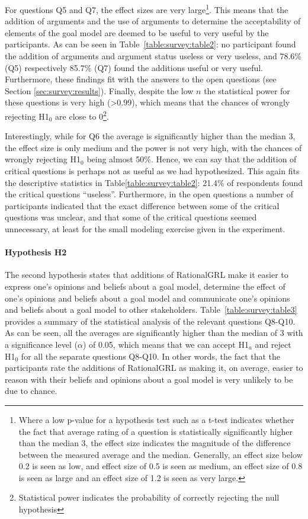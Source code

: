 For questions Q5 and Q7, the effect sizes are very large\footnote{Where a low p-value for a hypothesis test such as a t-test indicates whether the fact that average rating of a question is statistically significantly higher than the median 3, the effect size indicates the magnitude of the difference between the measured average and the median. Generally, an effect size below 0.2 is seen as low, and effect size of 0.5 is seen as medium, an effect size of 0.8 is seen as large and an effect size of 1.2 is seen as very large.}. This means that the addition of arguments and the use of arguments to determine the acceptability of elements of the goal model are deemed to be useful to very useful by the participants. As can be seen in Table~\ref{table:survey:table2}: no participant found the addition of arguments and argument status useless or very useless, and 78.6\% (Q5) respectively 85.7\% (Q7) found the additions useful or very useful. Furthermore, these findings fit with the answers to the open questions (see Section \ref{sec:survey:results}). Finally, despite the low $n$ the statistical power for these questions is very high (\textgreater 0.99), which means that the chances of wrongly rejecting H1$_{0}$ are close to 0\footnote{Statistical power indicates the probability of correctly rejecting the null hypothesis}. 

Interestingly, while for Q6 the average is significantly higher than the median 3, the effect size is only medium and the power is not very high, with the chances of wrongly rejecting H1$_{0}$ being almost 50\%. Hence, we can say that the addition of critical questions is perhaps not as useful as we had hypothesized. This again fits the descriptive statistics in Table\ref{table:survey:table2}: 21.4\% of respondents found the critical questions ``useless''. Furthermore, in the open questions a number of participants indicated that the exact difference between some of the critical questions was unclear, and that some of the critical questions seemed unnecessary, at least for the small modeling exercise given in the experiment.

\paragraph{Hypothesis H2}
The second hypothesis states that additions of RationalGRL make it easier to express one's opinions and beliefs about a goal model, determine the effect of one's opinions and beliefs about a goal model and communicate one's opinions and beliefs about a goal model to other stakeholders. Table~\ref{table:survey:table3} provides a summary of the statistical analysis of the relevant questions Q8-Q10. As can be seen, all the averages are significantly higher than the median of 3 with a significance level ($\alpha$) of 0.05, which means that we can accept H1$_{a}$ and reject H1$_{0}$ for all the separate questions Q8-Q10. In other words, the fact that the participants rate the additions of RationalGRL as making it, on average, easier to reason with their beliefs and opinions about a goal model is very unlikely to be due to chance. 

